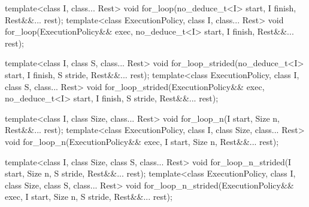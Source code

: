 \begin{itemdecl}
template<class I, class... Rest>
void for_loop(no_deduce_t<I> start, I finish, Rest&&... rest);
template<class ExecutionPolicy,
      class I, class... Rest>
void for_loop(ExecutionPolicy&& exec,
              no_deduce_t<I> start, I finish, Rest&&... rest);

template<class I, class S, class... Rest>
void for_loop_strided(no_deduce_t<I> start, I finish,
                      S stride, Rest&&... rest);
template<class ExecutionPolicy,
      class I, class S, class... Rest>
void for_loop_strided(ExecutionPolicy&& exec,
                      no_deduce_t<I> start, I finish,
                      S stride, Rest&&... rest);

template<class I, class Size, class... Rest>
void for_loop_n(I start, Size n, Rest&&... rest);
template<class ExecutionPolicy,
      class I, class Size, class... Rest>
void for_loop_n(ExecutionPolicy&& exec,
                I start, Size n, Rest&&... rest);

template<class I, class Size, class S, class... Rest>
void for_loop_n_strided(I start, Size n, S stride, Rest&&... rest);
template<class ExecutionPolicy,
      class I, class Size, class S, class... Rest>
void for_loop_n_strided(ExecutionPolicy&& exec,
                        I start, Size n, S stride, Rest&&... rest);
\end{itemdecl}

